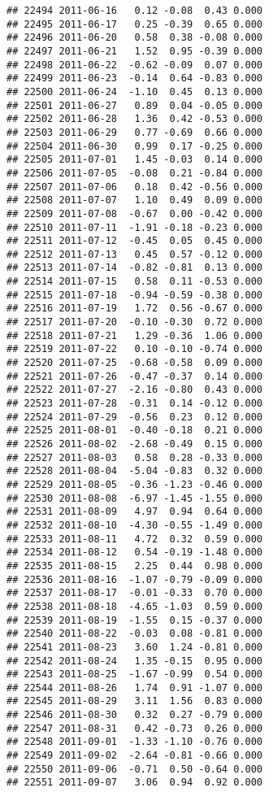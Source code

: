 \documentclass[
]{article}
\begin{document}
\begin{verbatim}
## 22494 2011-06-16   0.12 -0.08  0.43 0.000
## 22495 2011-06-17   0.25 -0.39  0.65 0.000
## 22496 2011-06-20   0.58  0.38 -0.08 0.000
## 22497 2011-06-21   1.52  0.95 -0.39 0.000
## 22498 2011-06-22  -0.62 -0.09  0.07 0.000
## 22499 2011-06-23  -0.14  0.64 -0.83 0.000
## 22500 2011-06-24  -1.10  0.45  0.13 0.000
## 22501 2011-06-27   0.89  0.04 -0.05 0.000
## 22502 2011-06-28   1.36  0.42 -0.53 0.000
## 22503 2011-06-29   0.77 -0.69  0.66 0.000
## 22504 2011-06-30   0.99  0.17 -0.25 0.000
## 22505 2011-07-01   1.45 -0.03  0.14 0.000
## 22506 2011-07-05  -0.08  0.21 -0.84 0.000
## 22507 2011-07-06   0.18  0.42 -0.56 0.000
## 22508 2011-07-07   1.10  0.49  0.09 0.000
## 22509 2011-07-08  -0.67  0.00 -0.42 0.000
## 22510 2011-07-11  -1.91 -0.18 -0.23 0.000
## 22511 2011-07-12  -0.45  0.05  0.45 0.000
## 22512 2011-07-13   0.45  0.57 -0.12 0.000
## 22513 2011-07-14  -0.82 -0.81  0.13 0.000
## 22514 2011-07-15   0.58  0.11 -0.53 0.000
## 22515 2011-07-18  -0.94 -0.59 -0.38 0.000
## 22516 2011-07-19   1.72  0.56 -0.67 0.000
## 22517 2011-07-20  -0.10 -0.30  0.72 0.000
## 22518 2011-07-21   1.29 -0.36  1.06 0.000
## 22519 2011-07-22   0.10 -0.10 -0.74 0.000
## 22520 2011-07-25  -0.68 -0.58  0.09 0.000
## 22521 2011-07-26  -0.47 -0.37  0.14 0.000
## 22522 2011-07-27  -2.16 -0.80  0.43 0.000
## 22523 2011-07-28  -0.31  0.14 -0.12 0.000
## 22524 2011-07-29  -0.56  0.23  0.12 0.000
## 22525 2011-08-01  -0.40 -0.18  0.21 0.000
## 22526 2011-08-02  -2.68 -0.49  0.15 0.000
## 22527 2011-08-03   0.58  0.28 -0.33 0.000
## 22528 2011-08-04  -5.04 -0.83  0.32 0.000
## 22529 2011-08-05  -0.36 -1.23 -0.46 0.000
## 22530 2011-08-08  -6.97 -1.45 -1.55 0.000
## 22531 2011-08-09   4.97  0.94  0.64 0.000
## 22532 2011-08-10  -4.30 -0.55 -1.49 0.000
## 22533 2011-08-11   4.72  0.32  0.59 0.000
## 22534 2011-08-12   0.54 -0.19 -1.48 0.000
## 22535 2011-08-15   2.25  0.44  0.98 0.000
## 22536 2011-08-16  -1.07 -0.79 -0.09 0.000
## 22537 2011-08-17  -0.01 -0.33  0.70 0.000
## 22538 2011-08-18  -4.65 -1.03  0.59 0.000
## 22539 2011-08-19  -1.55  0.15 -0.37 0.000
## 22540 2011-08-22  -0.03  0.08 -0.81 0.000
## 22541 2011-08-23   3.60  1.24 -0.81 0.000
## 22542 2011-08-24   1.35 -0.15  0.95 0.000
## 22543 2011-08-25  -1.67 -0.99  0.54 0.000
## 22544 2011-08-26   1.74  0.91 -1.07 0.000
## 22545 2011-08-29   3.11  1.56  0.83 0.000
## 22546 2011-08-30   0.32  0.27 -0.79 0.000
## 22547 2011-08-31   0.42 -0.73  0.26 0.000
## 22548 2011-09-01  -1.33 -1.10 -0.76 0.000
## 22549 2011-09-02  -2.64 -0.81 -0.66 0.000
## 22550 2011-09-06  -0.71  0.50 -0.64 0.000
## 22551 2011-09-07   3.06  0.94  0.92 0.000

\end{verbatim}
\end{document}
